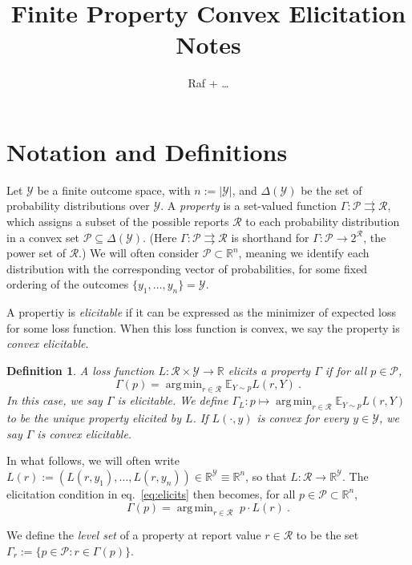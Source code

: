 \documentclass[12pt]{article}
\title{Finite Property Convex Elicitation Notes}
\author{Raf + \ldots}
\newcommand{\reals}{\mathbb{R}}
\newcommand{\E}{\mathbb{E}}
\renewcommand{\P}{\mathcal{P}}
\newcommand{\R}{\mathcal{R}}
\newcommand{\Y}{\mathcal{Y}}
\renewcommand{\P}{\mathcal{P}}
\newcommand{\toto}{\rightrightarrows}
\DeclareMathOperator*{\argmin}{arg\,min}
\newtheorem{definition}{Definition}
\begin{document}
\maketitle

\section{Notation and Definitions}

Let $\Y$ be a finite outcome space, with $n:=|\Y|$, and $\Delta(\Y)$ be the set of probability distributions over $\Y$.
A \emph{property} is a set-valued function $\Gamma: \P \toto \R$, which assigns a subset of the possible reports $\R$ to each probability distribution in a convex set $\P \subseteq \Delta(\Y)$.
(Here $\Gamma: \P \toto \R$ is shorthand for $\Gamma: \P \to 2^\R$, the power set of $\R$.)
We will often consider $\P \subset \reals^n$, meaning we identify each distribution with the corresponding vector of probabilities, for some fixed ordering of the outcomes $\{y_1,\ldots,y_n\} = \Y$.

A propertiy is \emph{elicitable} if it can be expressed as the minimizer of expected loss for some loss function.
When this loss function is convex, we say the property is \emph{convex elicitable}.
\begin{definition}
  \label{def:elicits}
  A loss function $L: \R \times \Y \to \reals$ \emph{elicits} a property $\Gamma$ if for all $p \in \P$,
  \begin{equation}
    \label{eq:elicits}
    \Gamma(p) = \argmin_{r\in\R} \E_{Y \sim p} L(r, Y)~.
  \end{equation}
  In this case, we say $\Gamma$ is \emph{elicitable}.
  We define $\Gamma_L:p\mapsto \argmin_{r\in\R} \E_{Y \sim p} L(r, Y)$ to be the unique property elicited by $L$.
  If $L(\cdot,y)$ is convex for every $y \in \Y$, we say $\Gamma$ is \emph{convex elicitable}.
\end{definition}

In what follows, we will often write $L(r) := (L(r,y_1),\ldots,L(r,y_n)) \in \reals^\Y \equiv \reals^n$, so that $L : \R \to \reals^\Y$.
The elicitation condition in eq.~\eqref{eq:elicits} then becomes, for all $p\in\P\subset \reals^n$,
\begin{equation}
  \label{eq:elicits-vectorized}
  \Gamma(p) = \argmin_{r\in\R} \; p \cdot L(r)~.
\end{equation}

We define the \emph{level set} of a property at report value $r\in\R$ to be the set $\Gamma_r := \{p\in\P : r \in \Gamma(p)\}$.
\end{document}
